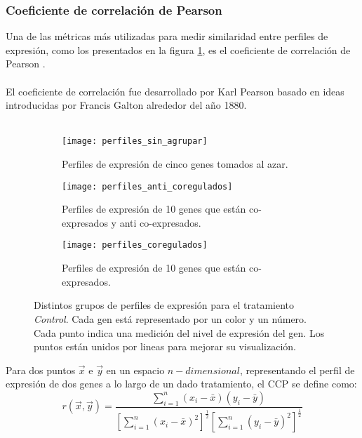 \subsubsection{Coeficiente de correlación de Pearson}
Una de las métricas más utilizadas para medir similaridad entre perfiles de expresión, como los presentados en la figura \ref{fig:perfiles_sin_agrupar}, es el coeficiente de correlación de Pearson \cite{Babu2004}.\\\\
El coeficiente de correlación fue desarrollado por Karl Pearson basado en ideas introducidas por Francis Galton alrededor del año 1880.\\\\
\begin{figure*}[t!]
    \centering
    \begin{subfigure}[t]{0.6\textwidth}
    \centering
    \texttt{[image: perfiles\_sin\_agrupar]}
    \caption{Perfiles de expresión de cinco genes tomados al azar.}
    \label{fig:perfiles_sin_agrupar}
    \end{subfigure}    
    
    \begin{subfigure}[t]{0.45\textwidth}
    \centering
    \texttt{[image: perfiles\_anti\_coregulados]}
    \caption{Perfiles de expresión de 10 genes que están co-expresados y anti co-expresados.}
    \label{fig:perfiles_anti_coregulados}
    \end{subfigure}
    \begin{subfigure}[t]{0.45\textwidth}
    \centering
    \texttt{[image: perfiles\_coregulados]}
    \caption{Perfiles de expresión de 10 genes que están co-expresados.}
    \label{fig:perfiles_coregulados}
    \end{subfigure}
    \caption{Distintos grupos de perfiles de expresión para el tratamiento \textit{Control}. Cada gen está representado por un color y un número. Cada punto indica una medición del nivel de expresión del gen. Los puntos están unidos por lineas para mejorar su visualización.}
\end{figure*}
Para dos puntos $\vec{x}$ e $\vec{y}$ en un espacio $n-dimensional$, representando el perfil de expresión de dos genes a lo largo de un dado tratamiento, el CCP se define como:
\begin{equation}
	r(\vec{x}, \vec{y}) = \frac{\sum\limits_{i=1}^n(x_i-\bar{x})(y_i-\bar{y})}{[\sum\limits_{i=1}^n(x_i-\bar{x})^2]^\frac{1}{2}[\sum\limits_{i=1}^n(y_i-\bar{y})^2]^\frac{1}{2}}
	\label{eq:ccp}
\end{equation}
